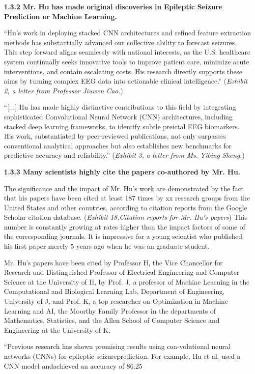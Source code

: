 \documentclass{article}
\begin{document}
{\bf 1.3.2 Mr. Hu has made original discoveries in Epileptic Seizure Prediction or Machine Learning. }

“Hu’s work in deploying stacked CNN architectures and refined feature extraction methods has substantially advanced our collective ability to forecast seizures. This step forward aligns seamlessly with national interests, as the U.S. healthcare system continually seeks innovative tools to improve patient care, minimize acute interventions, and contain escalating costs. His research directly supports these aims by turning complex EEG data into actionable clinical intelligence.” ({\it Exhibit 2, a letter from Professor Jiuwen Cao.}) 

“[...] Hu has made highly distinctive contributions to this field by integrating sophisticated Convolutional Neural Network (CNN) architectures, including stacked deep learning frameworks, to identify subtle preictal EEG biomarkers. His work, substantiated by peer-reviewed publications, not only surpasses conventional analytical approaches but also establishes new benchmarks for predictive accuracy and reliability.” ({\it Exhibit 3, a letter from Ms. Yibing Sheng.}) 

{\bf 1.3.3 Many scientists highly cite the papers co-authored by Mr. Hu. }

The significance and the impact of Mr. Hu’s work are demonstrated by the fact that his papers have been cited at least 187 times by xx research groups from the United States and other countries, according to citation reports from the Google Scholar citation database. ({\it Exhibit 18,Citation reports for Mr. Hu’s papers}) This number is constantly growing at rates higher than the impact factors of some of the corresponding journals. It is impressive for a young scientist who published his first paper merely 5 years ago when he was an graduate student. 

Mr. Hu’s papers have been cited by Professor H, the Vice Chancellor for Research and Distinguished Professor of Electrical Engineering and Computer Science at the University of H, by Prof. J, a professor of Machine Learning in the Computational and Biological Learning Lab, Department of Engineering, University of J, and Prof. K, a top researcher on Optimization in Machine Learning and AI, the Moorthy Family Professor in the departments of Mathematics, Statistics, and the Allen School of Computer Science and Engineering at the University of K.

“Previous research has shown promising results using con-volutional neural networks (CNNs) for epileptic seizureprediction. For example, Hu et al. used a CNN model andachieved an accuracy of 86.25%
\end{document}
